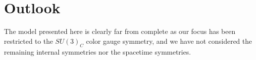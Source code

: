\documentclass{article}
\newcommand{\bb}[1]{\mathbb{#1}}
\begin{document}




\section{Outlook}

The model presented here is clearly far from complete as our focus has been restricted to the $SU(3)_C$ color gauge symmetry, and we have not considered the remaining internal symmetries nor the spacetime symmetries. 
\end{document}
